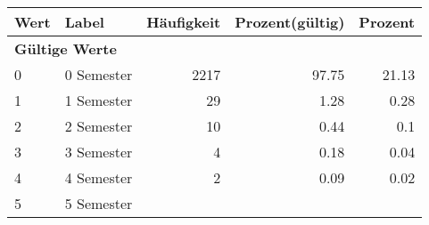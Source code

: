      \begin{longtable}{lXrrr}
     \toprule
     \textbf{Wert} & \textbf{Label} & \textbf{Häufigkeit} & \textbf{Prozent(gültig)} & \textbf{Prozent} \\
     \endhead
     \midrule
     \multicolumn{5}{l}{\textbf{Gültige Werte}}\\

     0 &
     \multicolumn{1}{X}{ 0 Semester   } &


       \num{2217} &
       \num[round-mode=places,round-precision=2]{97.75} &
         \num[round-mode=places,round-precision=2]{21.13} \\

     1 &
     \multicolumn{1}{X}{ 1 Semester   } &


       \num{29} &
       \num[round-mode=places,round-precision=2]{1.28} &
         \num[round-mode=places,round-precision=2]{0.28} \\

     2 &
     \multicolumn{1}{X}{ 2 Semester   } &


       \num{10} &
       \num[round-mode=places,round-precision=2]{0.44} &
         \num[round-mode=places,round-precision=2]{0.1} \\

     3 &
     \multicolumn{1}{X}{ 3 Semester   } &


       \num{4} &
       \num[round-mode=places,round-precision=2]{0.18} &
         \num[round-mode=places,round-precision=2]{0.04} \\

     4 &
     \multicolumn{1}{X}{ 4 Semester   } &


       \num{2} &
       \num[round-mode=places,round-precision=2]{0.09} &
         \num[round-mode=places,round-precision=2]{0.02} \\

     5 &
     \multicolumn{1}{X}{ 5 Semester   } &



\end{longtable}
